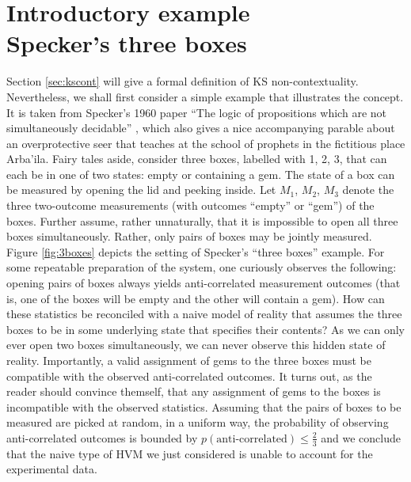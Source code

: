 \section[Introductory example\\ Specker's three boxes]{Introductory example\\ \large{Specker's three boxes}}
\label{sec:threeboxes}
Section \ref{sec:kscont} will give a formal definition of KS non-contextuality. Nevertheless, we shall first consider a simple example that illustrates the concept. It is taken from Specker's 1960 paper “The logic of propositions which are not simultaneously decidable” \cite{Specker1975}, which also gives a nice accompanying parable about an overprotective seer that teaches at the school of prophets in the fictitious place Arba’ila. Fairy tales aside, consider three boxes, labelled with 1, 2, 3, that can each be in one of two states: empty or containing a gem. The state of a box can be measured by opening the lid and peeking inside. Let $M_{1}$, $M_{2}$, $M_{3}$ denote the three two-outcome measurements (with outcomes “empty” or “gem”) of the boxes. Further assume, rather unnaturally, that it is impossible to open all three boxes simultaneously. Rather, only pairs of boxes may be jointly measured. Figure \ref{fig:3boxes} depicts the setting of Specker's “three boxes” example. For some repeatable preparation of the system, one curiously observes the following: opening pairs of boxes always yields anti-correlated measurement outcomes (that is, one of the boxes will be empty and the other will contain a gem). How can these statistics be reconciled with a naive model of reality that assumes the three boxes to be in some underlying state that specifies their contents? As we can only ever open two boxes simultaneously, we can never observe this hidden state of reality. Importantly, a valid assignment of gems to the three boxes must be compatible with the observed anti-correlated outcomes. It turns out, as the reader should convince themself, that any assignment of gems to the boxes is incompatible with the observed statistics. Assuming that the pairs of boxes to be measured are picked at random, in a uniform way, the probability of observing anti-correlated outcomes is bounded by $p(\text{anti-correlated})\leqslant\frac{2}{3}$ and we conclude that the naive type of HVM we just considered is unable to account for the experimental data.

